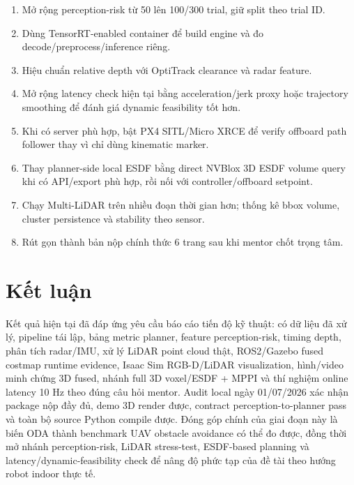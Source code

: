 \documentclass[10pt,a4paper]{article}
\begin{document}
\begin{enumerate}
  \item Mở rộng perception-risk từ 50 lên 100/300 trial, giữ split theo trial ID.
  \item Dùng TensorRT-enabled container để build engine và đo decode/preprocess/inference riêng.
  \item Hiệu chuẩn relative depth với OptiTrack clearance và radar feature.
  \item Mở rộng latency check hiện tại bằng acceleration/jerk proxy hoặc trajectory smoothing để đánh giá dynamic feasibility tốt hơn.
  \item Khi có server phù hợp, bật PX4 SITL/Micro XRCE để verify offboard path follower thay vì chỉ dùng kinematic marker.
  \item Thay planner-side local ESDF bằng direct NVBlox 3D ESDF volume query khi có API/export phù hợp, rồi nối với controller/offboard setpoint.
  \item Chạy Multi-LiDAR trên nhiều đoạn thời gian hơn; thống kê bbox volume, cluster persistence và stability theo sensor.
  \item Rút gọn thành bản nộp chính thức 6 trang sau khi mentor chốt trọng tâm.
\end{enumerate}

\section{Kết luận}

Kết quả hiện tại đã đáp ứng yêu cầu báo cáo tiến độ kỹ thuật: có dữ liệu đã xử lý, pipeline tái lập, bảng metric planner, feature perception-risk, timing depth, phân tích radar/IMU, xử lý LiDAR point cloud thật, ROS2/Gazebo fused costmap runtime evidence, Isaac Sim RGB-D/LiDAR visualization, hình/video minh chứng 3D fused, nhánh full 3D voxel/ESDF + MPPI và thí nghiệm online latency 10 Hz theo đúng câu hỏi mentor. Audit local ngày 01/07/2026 xác nhận package nộp đầy đủ, demo 3D render được, contract perception-to-planner pass và toàn bộ source Python compile được. Đóng góp chính của giai đoạn này là biến ODA thành benchmark UAV obstacle avoidance có thể đo được, đồng thời mở nhánh perception-risk, LiDAR stress-test, ESDF-based planning và latency/dynamic-feasibility check để nâng độ phức tạp của đề tài theo hướng robot indoor thực tế.
\end{document}
